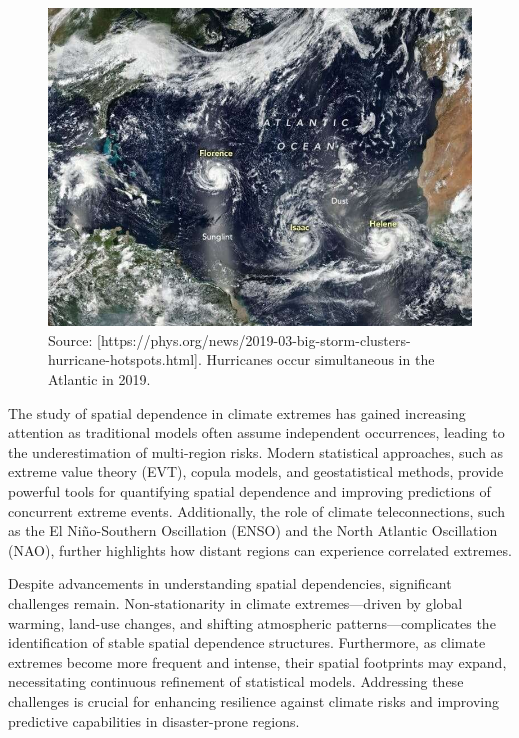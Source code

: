 \documentclass[
]{krantz}
\begin{document}
\vspace{1em}
\begin{figure}

{\centering \includegraphics[width=0.8\linewidth]{work/06-anthropo/figures/atlantic} 

}

\caption{Source: [https://phys.org/news/2019-03-big-storm-clusters-hurricane-hotspots.html]. Hurricanes occur simultaneous in the Atlantic in 2019.}\label{fig:unnamed-chunk-5}
\end{figure}
\vspace{1em}

The study of spatial dependence in climate extremes has gained increasing attention as traditional models often assume independent occurrences, leading to the underestimation of multi-region risks. Modern statistical approaches, such as extreme value theory (EVT), copula models, and geostatistical methods, provide powerful tools for quantifying spatial dependence and improving predictions of concurrent extreme events. Additionally, the role of climate teleconnections, such as the El Niño-Southern Oscillation (ENSO) and the North Atlantic Oscillation (NAO), further highlights how distant regions can experience correlated extremes.

Despite advancements in understanding spatial dependencies, significant challenges remain. Non-stationarity in climate extremes---driven by global warming, land-use changes, and shifting atmospheric patterns---complicates the identification of stable spatial dependence structures. Furthermore, as climate extremes become more frequent and intense, their spatial footprints may expand, necessitating continuous refinement of statistical models. Addressing these challenges is crucial for enhancing resilience against climate risks and improving predictive capabilities in disaster-prone regions.
\end{document}

